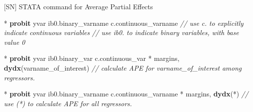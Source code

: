 \documentclass[
  10pt,
  ignorenonframetext,
]{beamer}
\newenvironment{Shaded}{\begin{snugshade}}{\end{snugshade}}
\newcommand{\CommentTok}[1]{\textcolor[rgb]{0.56,0.35,0.01}{\textit{#1}}}
\newcommand{\KeywordTok}[1]{\textcolor[rgb]{0.13,0.29,0.53}{\textbf{#1}}}
\newcommand{\NormalTok}[1]{#1}
\begin{document}
\begin{frame}[fragile]{{[}SN{]} STATA command for Average Partial
Effects}
\protect\hypertarget{sn-stata-command-for-average-partial-effects}{}
\small

\begin{Shaded}
\begin{Highlighting}[]
\NormalTok{* }\KeywordTok{probit}\NormalTok{ yvar ib0.binary\_varname c.continuous\_varname}
\CommentTok{// use \textquotesingle{}c.\textquotesingle{} to explicitly indicate continuous variables}
\CommentTok{// use \textquotesingle{}ib0.\textquotesingle{} to indicate binary variables, with base value 0}
\end{Highlighting}
\end{Shaded}

\begin{Shaded}
\begin{Highlighting}[]
\NormalTok{* }\KeywordTok{probit}\NormalTok{ yvar ib0.binary\_var c.continuous\_var}
\NormalTok{* margins, }\KeywordTok{dydx}\NormalTok{(varname\_of\_interest)}
\CommentTok{// calculate APE for varname\_of\_interest among regressors.}
\end{Highlighting}
\end{Shaded}

\begin{Shaded}
\begin{Highlighting}[]
\NormalTok{* }\KeywordTok{probit}\NormalTok{ yvar ib0.binary\_varname c.continuous\_varname}
\NormalTok{* margins, }\KeywordTok{dydx}\NormalTok{(*)}
\CommentTok{// use (*) to calculate APE for all regressors.}
\end{Highlighting}
\end{Shaded}
\end{frame}
\end{document}
